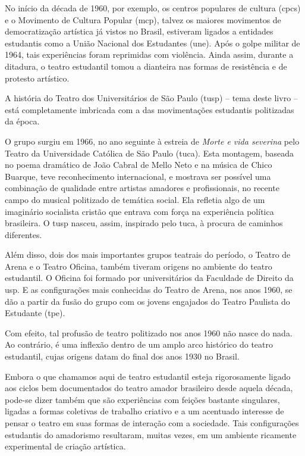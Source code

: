 No início da década de 1960, por exemplo, os centros populares de
cultura ({\sc cpc}s) e o Movimento de Cultura Popular ({\sc mcp}), talvez os maiores
movimentos de democratização artística já vistos no Brasil, estiveram
ligados a entidades estudantis como a União Nacional dos Estudantes
({\sc une}). Após o golpe militar de 1964, tais experiências foram reprimidas
com violência. Ainda assim, durante a ditadura, o teatro estudantil
tomou a dianteira nas formas de resistência e de protesto artístico.

A história do Teatro dos Universitários de São Paulo ({\sc tusp}) -- tema deste
livro -- está completamente imbricada com a das movimentações estudantis
politizadas da época.

O grupo surgiu em 1966, no ano seguinte à estreia de {\it Morte e vida
severina} pelo Teatro da Universidade Católica de São Paulo ({\sc tuca}). Esta
montagem, baseada no poema dramático de João Cabral de Mello Neto e na
música de Chico Buarque, teve reconhecimento internacional, e mostrava
ser possível uma combinação de qualidade entre artistas amadores e
profissionais, no recente campo do musical politizado de temática
social. Ela refletia algo de um imaginário socialista cristão que
entrava com força na experiência política brasileira. O {\sc tusp} nasceu,
assim, inspirado pelo {\sc tuca}, à procura de caminhos diferentes.

Além disso, dois dos mais importantes grupos teatrais do período, o
Teatro de Arena e o Teatro Oficina, também tiveram origens no ambiente
do teatro estudantil. O Oficina foi formado por universitários da
Faculdade de Direito da {\sc usp}. E as configurações mais conhecidas do
Teatro de Arena, nos anos 1960, se dão a partir da fusão do grupo com os
jovens engajados do Teatro Paulista do Estudante ({\sc tpe}).

Com efeito, tal profusão de teatro politizado nos anos 1960 não nasce do
nada. Ao contrário, é uma inflexão dentro de um amplo arco histórico do
teatro estudantil, cujas origens datam do final dos anos 1930 no Brasil.

Embora o que chamamos aqui de teatro estudantil esteja rigorosamente
ligado aos ciclos bem documentados do teatro amador brasileiro desde
aquela década, pode-se dizer também que são experiências com feições
bastante singulares, ligadas a formas coletivas de trabalho criativo e a
um acentuado interesse de pensar o teatro em suas formas de interação
com a sociedade. Tais configurações estudantis do amadorismo resultaram,
muitas vezes, em um ambiente ricamente experimental de criação
artística.

